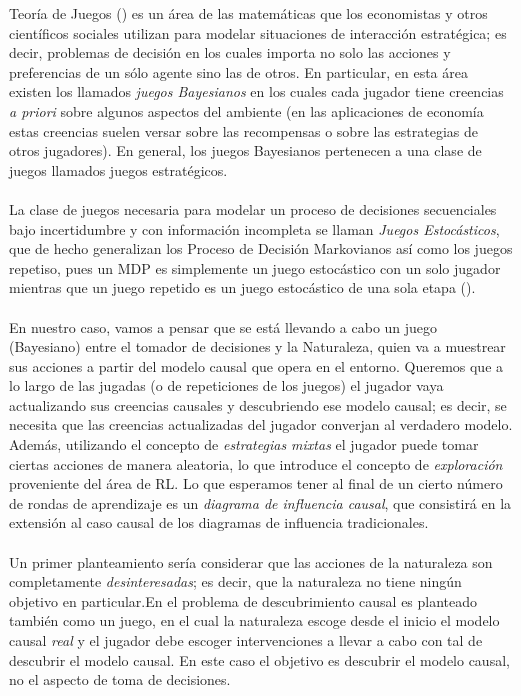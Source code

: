 \documentclass[11pt]{article}
\theoremstyle{plain}
\begin{document}
Teoría de Juegos (\cite{osborne1994course}) es un área de las matemáticas que los economistas y otros científicos sociales utilizan para modelar situaciones de interacción estratégica; es decir, problemas de decisión en los cuales importa no solo las acciones y preferencias de un sólo agente sino las de otros. En particular, en esta área existen los llamados \textit{juegos Bayesianos} en los cuales cada jugador tiene creencias \textit{a priori} sobre algunos aspectos del ambiente (en las aplicaciones de economía estas creencias suelen versar sobre las recompensas o sobre las estrategias de otros jugadores). En general, los juegos Bayesianos pertenecen a una clase de juegos llamados juegos estratégicos.\\
\\
La clase de juegos necesaria para modelar un proceso de decisiones secuenciales bajo incertidumbre y con información incompleta se llaman \textit{Juegos Estocásticos}, que de hecho generalizan los Proceso de Decisión Markovianos así como los juegos repetiso, pues un MDP es simplemente un juego estocástico con un solo jugador mientras que un juego repetido es un juego estocástico de una sola etapa (\cite{shoham2008multiagent}).\\
\\
En nuestro caso, vamos a pensar que se está llevando a cabo un juego (Bayesiano) entre el tomador de decisiones y la Naturaleza, quien va a muestrear sus acciones a partir del modelo causal que opera en el entorno. Queremos que a lo largo de las jugadas (o de repeticiones de los juegos) el jugador vaya actualizando sus creencias causales y descubriendo ese modelo causal; es decir, se necesita que las creencias actualizadas del jugador converjan al verdadero modelo. Además, utilizando el concepto de \textit{estrategias mixtas} el jugador puede tomar ciertas acciones de manera aleatoria, lo que introduce el concepto de \textit{exploración} proveniente del área de RL. Lo que esperamos tener al final de un cierto número de rondas de aprendizaje es un \textit{diagrama de influencia causal}, que consistirá en la extensión al caso causal de los diagramas de influencia tradicionales.\\
\\
Un primer planteamiento sería considerar que las acciones de la naturaleza son completamente \textit{desinteresadas}; es decir, que la naturaleza no tiene ningún objetivo en particular.En \cite{eberhardt2008causal} el problema de descubrimiento causal es planteado también como un juego, en el cual la naturaleza escoge desde el inicio el modelo causal \textit{real} y el jugador debe escoger intervenciones a llevar a cabo con tal de descubrir el modelo causal. En este caso el objetivo es descubrir el modelo causal, no el aspecto de toma de decisiones.
\end{document}
